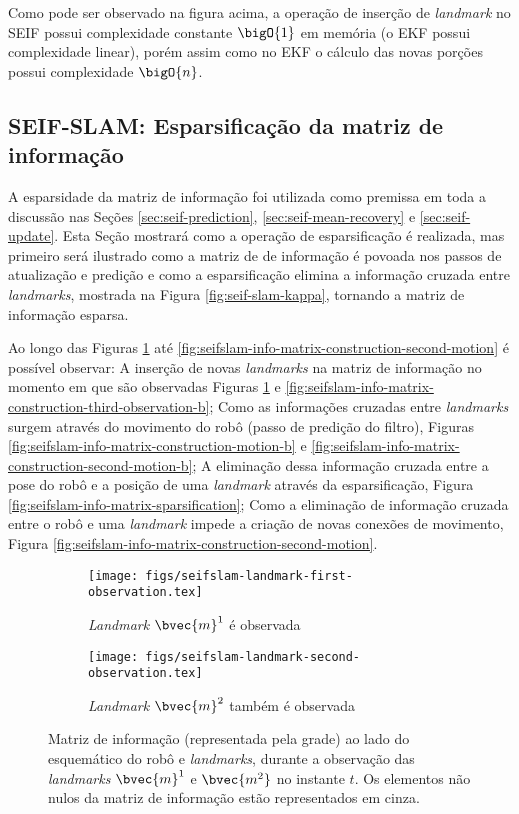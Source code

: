 Como pode ser observado na figura acima, a operação de inserção de \textit{landmark} no SEIF possui complexidade constante $\bigO{1}$ em memória (o EKF possui complexidade linear), porém assim como no EKF o cálculo das 
novas porções possui complexidade $\bigO{n}$.

\subsection{SEIF-SLAM: Esparsificação da matriz de informação}
A esparsidade da matriz de informação foi utilizada como premissa em 
toda a discussão nas Seções \ref{sec:seif-prediction}, \ref{sec:seif-mean-recovery} e \ref{sec:seif-update}. Esta Seção mostrará como a operação de esparsificação é realizada, mas primeiro será 
ilustrado como a matriz de de informação é povoada nos passos de 
atualização e predição e como a esparsificação elimina a informação 
cruzada entre \textit{landmarks}, mostrada na Figura \ref{fig:seif-slam-kappa}, tornando a matriz de informação esparsa.

Ao longo das Figuras \ref{fig:seifslam-info-matrix-construction-observation} até \ref{fig:seifslam-info-matrix-construction-second-motion} é possível 
observar: A inserção de novas \textit{landmarks} na matriz de informação no momento em que são observadas Figuras \ref{fig:seifslam-info-matrix-construction-observation} e \ref{fig:seifslam-info-matrix-construction-third-observation-b}; Como as 
informações cruzadas entre \textit{landmarks} surgem através do 
movimento do robô (passo de predição do filtro), Figuras \ref{fig:seifslam-info-matrix-construction-motion-b} e \ref{fig:seifslam-info-matrix-construction-second-motion-b}; A 
eliminação dessa informação cruzada entre a pose do robô e a posição de uma \textit{landmark} através da esparsificação, Figura \ref{fig:seifslam-info-matrix-sparsification}; Como a eliminação de 
informação cruzada entre o robô e uma \textit{landmark} impede a criação de novas conexões de movimento, Figura \ref{fig:seifslam-info-matrix-construction-second-motion}.

\begin{figure}[h]
  \begin{subfigure}{0.475\textwidth}
    \texttt{[image: figs/seifslam-landmark-first-observation.tex]} 
    \caption{\textit{Landmark} $\bvec{m}^1$ é observada}
  \end{subfigure}
  \hfill
  \begin{subfigure}{0.475\textwidth}
    \texttt{[image: figs/seifslam-landmark-second-observation.tex]}
    \caption{\textit{Landmark} $\bvec{m}^2$ também é observada}
  \end{subfigure}
  \caption{Matriz de informação (representada pela grade) ao lado do esquemático do robô e \textit{landmarks}, durante a observação das 
  \textit{landmarks} $\bvec{m}^1$ e $\bvec{m^2}$ no instante $t$. Os elementos não nulos da matriz de informação estão representados em cinza.}
  \label{fig:seifslam-info-matrix-construction-observation}
\end{figure}

